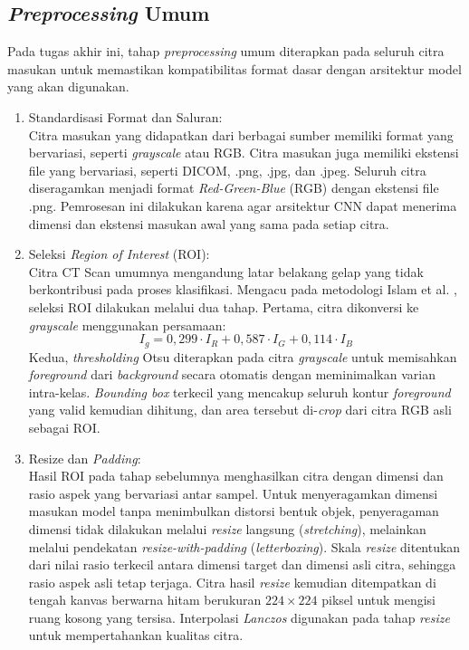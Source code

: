 \subsection{\textit{Preprocessing} Umum}
Pada tugas akhir ini, tahap \textit{preprocessing} umum diterapkan pada seluruh citra masukan untuk memastikan kompatibilitas format dasar dengan arsitektur model yang akan digunakan.
\begin{enumerate}
	\item Standardisasi Format dan Saluran: \\
	Citra masukan yang didapatkan dari berbagai sumber memiliki format yang bervariasi, seperti \textit{grayscale} atau RGB. Citra masukan juga memiliki ekstensi file yang bervariasi, seperti DICOM, .png, .jpg, dan .jpeg. Seluruh citra diseragamkan menjadi format \textit{Red-Green-Blue} (RGB) dengan ekstensi file .png. Pemrosesan ini dilakukan karena agar arsitektur CNN dapat menerima dimensi dan ekstensi masukan awal yang sama pada setiap citra.
	
	\item Seleksi \textit{Region of Interest} (ROI): \\
	Citra CT Scan umumnya mengandung latar belakang gelap yang tidak berkontribusi pada proses klasifikasi. Mengacu pada metodologi Islam et al. \cite{islam2024deep}, seleksi ROI dilakukan melalui dua tahap. Pertama, citra dikonversi ke \textit{grayscale} menggunakan persamaan:
	\begin{equation}
		I_g = 0{,}299 \cdot I_R + 0{,}587 \cdot I_G + 0{,}114 \cdot I_B
	\end{equation}
	Kedua, \textit{thresholding} Otsu diterapkan pada citra \textit{grayscale} untuk memisahkan \textit{foreground} dari \textit{background} secara otomatis dengan meminimalkan varian intra-kelas. \textit{Bounding box} terkecil yang mencakup seluruh kontur \textit{foreground} yang valid kemudian dihitung, dan area tersebut di-\textit{crop} dari citra RGB asli sebagai ROI.
	
	\item Resize dan \textit{Padding}: \\ %
	Hasil ROI pada tahap sebelumnya menghasilkan citra dengan dimensi dan rasio aspek yang bervariasi antar sampel. Untuk menyeragamkan dimensi masukan model tanpa menimbulkan distorsi bentuk objek, penyeragaman dimensi tidak dilakukan melalui \textit{resize} langsung (\textit{stretching}), melainkan melalui pendekatan \textit{resize-with-padding} (\textit{letterboxing}). Skala \textit{resize} ditentukan dari nilai rasio terkecil antara dimensi target dan dimensi asli citra, sehingga rasio aspek asli tetap terjaga. Citra hasil \textit{resize} kemudian ditempatkan di tengah kanvas berwarna hitam berukuran $224 \times 224$ piksel untuk mengisi ruang kosong yang tersisa. Interpolasi \textit{Lanczos} digunakan pada tahap \textit{resize} untuk mempertahankan kualitas citra.
\end{enumerate}


